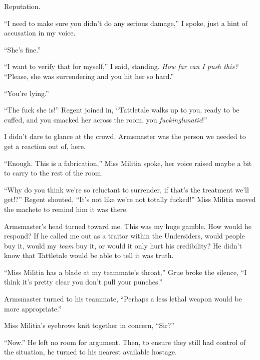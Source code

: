 Reputation.



``I need to make sure you didn't do any serious damage,'' I spoke, just a hint of accusation in my voice.



``She's fine.''



``I want to verify that for myself,'' I said, standing.  \emph{How far can I push this?}  ``Please, she was surrendering and you hit her so hard.''



``You're lying.''



``The fuck she is!'' Regent joined in, ``Tattletale walks up to you, ready to be cuffed, and you smacked her across the room, you \emph{fucking}\emph{lunatic}!''



I didn't dare to glance at the crowd.  Armsmaster was the person we needed to get a reaction out of, here.



``Enough.  This is a fabrication,'' Miss Militia spoke, her voice raised maybe a bit to carry to the rest of the room.



``Why do you think we're so reluctant to surrender, if that's the treatment we'll get!?'' Regent shouted, ``It's not like we're not totally fucked!''  Miss Militia moved the machete to remind him it was there.



Armsmaster's head turned toward me.  This was my huge gamble.  How would he respond?  If he called me out as a traitor within the Undersiders, would people buy it, would my \emph{team} buy it, or would it only hurt his credibility?  He didn't know that Tattletale would be able to tell it was truth.



``Miss Militia has a blade at my teammate's throat,'' Grue broke the silence, ``I think it's pretty clear you don't pull your punches.''



Armsmaster turned to his teammate, ``Perhaps a less lethal weapon would be more appropriate.''



Miss Militia's eyebrows knit together in concern, ``Sir?''



``Now.''  He left no room for argument.  Then, to ensure they still had control of the situation, he turned to his nearest available hostage.



